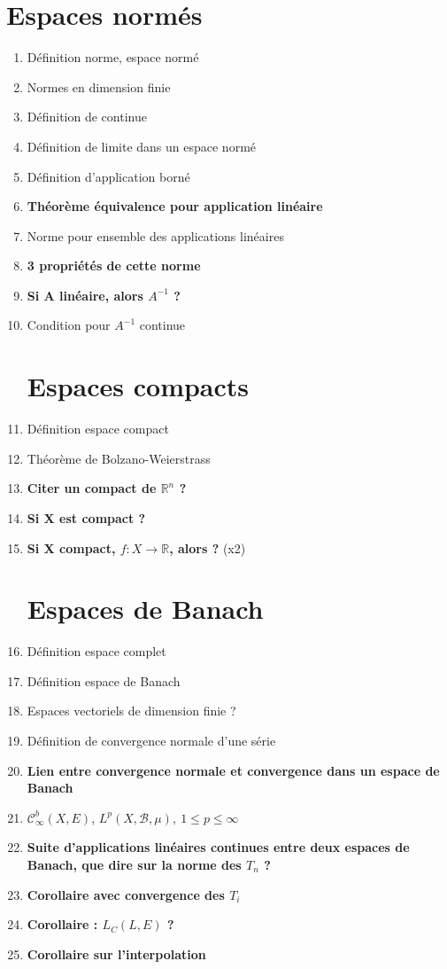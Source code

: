 \documentclass{article}
\begin{document}
\section{Espaces normés}
\begin{enumerate}
	\item Définition norme, espace normé
	\item Normes en dimension finie
	\item Définition de continue
	\item Définition de limite dans un espace normé
	\item Définition d'application borné
	\item \textbf{Théorème équivalence pour application linéaire}
	\item Norme pour ensemble des applications linéaires
	\item \textbf{3 propriétés de cette norme}
	\item \textbf{Si A linéaire, alors $A^{-1}$ ?}
	\item Condition pour $A^{-1}$ continue
\section{Espaces compacts}
	\item Définition espace compact
	\item Théorème de Bolzano-Weierstrass
	\item \textbf{Citer un compact de $\mathbb{R}^n$ ?}
	\item \textbf{Si X est compact ?}
	\item \textbf{Si X compact, $f: X\to \mathbb{R}$, alors ?} (x2)
\section{Espaces de Banach}
	\item Définition espace complet
	\item Définition espace de Banach
	\item Espaces vectoriels de dimension finie ?
	\item Définition de convergence normale d'une série
	\item \textbf{Lien entre convergence normale et convergence dans un espace de Banach}
	\item $\mathcal{C}_{\infty}^b(X,E)$, $L^p(X,\mathcal{B},\mu),\ 1\leq p\leq\infty$
	\item \textbf{Suite d'applications linéaires continues entre deux espaces de Banach, que dire sur la norme des $T_n$ ?}
	\item \textbf{Corollaire avec convergence des $T_i$}
	\item \textbf{Corollaire : $L_C(L,E)$ ?}
	\item \textbf{Corollaire sur l'interpolation}

\end{enumerate}
\end{document}
